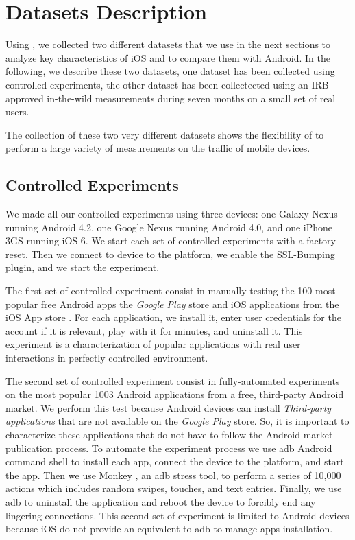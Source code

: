 \section{Datasets Description}
\label{sec:dataset}
Using \platname, we collected two different datasets that we use in the
next sections to analyze key characteristics of iOS and to compare them
with Android. In the following, we describe these two datasets, one
dataset has been collected using controlled experiments, the other
dataset has been collectected using an IRB-approved in-the-wild
measurements during seven months on a small set of real users. 

The collection of these two very different datasets shows the
flexibility of \platname{} to perform a large variety of measurements
on the traffic of mobile devices. 

\subsection{Controlled Experiments}
\label{sec:dataset-contr-exper}
We made all our controlled experiments using three devices: one Galaxy
Nexus running Android 4.2, one Google Nexus running Android 4.0, and
one iPhone 3GS running iOS 6. We start each set of controlled experiments
 with a factory reset. Then we connect to device to the
\platname{} platform, we enable the SSL-Bumping plugin, and we start
the experiment. 

The first set of controlled experiment consist in manually testing the
100 most popular free Android apps the \emph{Google Play} store and \tbd{}
iOS applications from the iOS App store . For each
application, we install it, enter user credentials for the account if
it is relevant, play with it for \tbd{} minutes, and uninstall
it. This experiment is a characterization of popular applications with
real user interactions in perfectly controlled environment. 

The second set of controlled experiment consist in fully-automated
experiments on the most popular 1003 Android applications from a free,
third-party Android market.
We perform this test because Android devices can install
\emph{Third-party applications} that are not available on the
\emph{Google Play} store. So, it is important to characterize these
applications that do not have to follow the Android market publication
process. To
automate the experiment process we use adb Android command shell to
install each app, connect the device to the \platname{} platform, and
start the app. Then we use Monkey , an adb
stress tool, to perform a series of 10,000 actions which includes
random swipes, touches, and text entries.  Finally, we use adb to
uninstall the application and reboot the device to forcibly end any
lingering connections. This second set of experiment is limited to
Android devices because iOS do not provide an equivalent to adb to
manage apps installation. 

